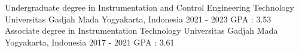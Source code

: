 

\begin{cventries}

  \cventry
    {Undergraduate degree in Instrumentation and Control Engineering Technology} %
    {Universitas Gadjah Mada} %
    {Yogyakarta, Indonesia} %
    {2021 - 2023} %
    {GPA : 3.53}
  \cventry
    {Associate degree in Instrumentation Technology} %
    {Universitas Gadjah Mada} %
    {Yogyakarta, Indonesia} %
    {2017 - 2021} %
    {GPA : 3.61}
\end{cventries}
